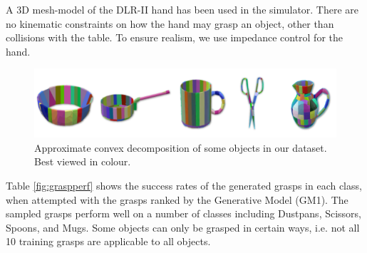 A 3D mesh-model of the DLR-II hand has been used in the simulator. There are no kinematic constraints on how the hand may grasp an object, other than collisions with the table. To ensure realism, we use impedance control for the hand.
\begin{figure}
  \includegraphics[width=\linewidth]{images/decomposition.png}
  \caption{Approximate convex decomposition of some objects in our dataset. Best viewed in colour.}
  \label{fig:objectDecomposition}
\end{figure}

Table \ref{fig:graspperf} shows the success rates of the generated grasps in each class, when attempted with the grasps ranked by the Generative Model (GM1). The sampled grasps perform well on a number of classes including Dustpans, Scissors, Spoons, and Mugs. Some objects can only be grasped in certain ways, i.e. not all 10 training grasps are applicable to all objects.

